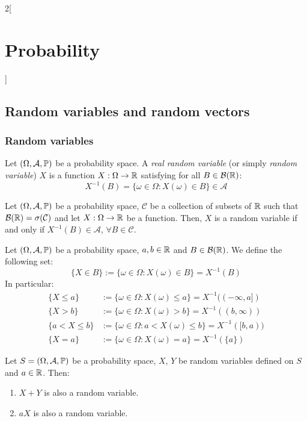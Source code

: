 \documentclass[../../../main.tex]{subfiles}
\begin{document}
\begin{multicols}{2}[\section{Probability}]
    \subsection{Random variables and random vectors}
    \subsubsection{Random variables}
    \begin{definition}
        Let $(\Omega,\mathcal{A},\mathbb{P})$ be a probability space. A \textit{real random variable} (or simply \emph{random variable}) $X$ is a function $X:\Omega\rightarrow\mathbb{R}$ satisfying for all $B\in\mathcal{B}(\mathbb{R})$: $$X^{-1}(B)=\{\omega\in\Omega:X(\omega)\in B\}\in\mathcal{A}$$
    \end{definition}
    \begin{prop}
        Let $(\Omega,\mathcal{A},\mathbb{P})$ be a probability space, $\mathcal{C}$ be a collection of subsets of $\mathbb{R}$ such that $\mathcal{B}(\mathbb{R})=\sigma(\mathcal{C})$ and let $X:\Omega\rightarrow\mathbb{R}$ be a function. Then, $X$ is a random variable if and only if $X^{-1}(B)\in\mathcal{A}$, $\forall B\in \mathcal{C}$.
    \end{prop}
    \begin{definition}
        Let $(\Omega,\mathcal{A},\mathbb{P})$ be a probability space, $a,b\in\mathbb{R}$ and $B\in\mathcal{B}(\mathbb{R})$. We define the following set:
        $$\{X\in B\}:=\{\omega\in\Omega:X(\omega)\in B\}=X^{-1}(B)$$
        In particular:
        \begin{align*}
            \{X\leq a\}   & :=\{\omega\in\Omega:X(\omega)\leq a\}=X^{-1}((-\infty,a]) \\
            \{X> b\}      & :=\{\omega\in\Omega:X(\omega)>b\}=X^{-1}((b,\infty))      \\
            \{a<X\leq b\} & :=\{\omega\in\Omega:a< X(\omega)\leq b\}=X^{-1}([b,a))    \\
            \{X=a\}       & :=\{\omega\in\Omega:X(\omega)=a\}=X^{-1}(\{a\})
        \end{align*}
    \end{definition}
    \begin{prop}
        Let $S=(\Omega,\mathcal{A},\mathbb{P})$ be a probability space, $X$, $Y$ be random variables defined on $S$ and $a\in\mathbb{R}$. Then:
        \begin{enumerate}
            \item $X+Y$ is also a random variable.
            \item $aX$ is also a random variable.

\end{enumerate}
\end{prop}
\end{multicols}
\end{document}
